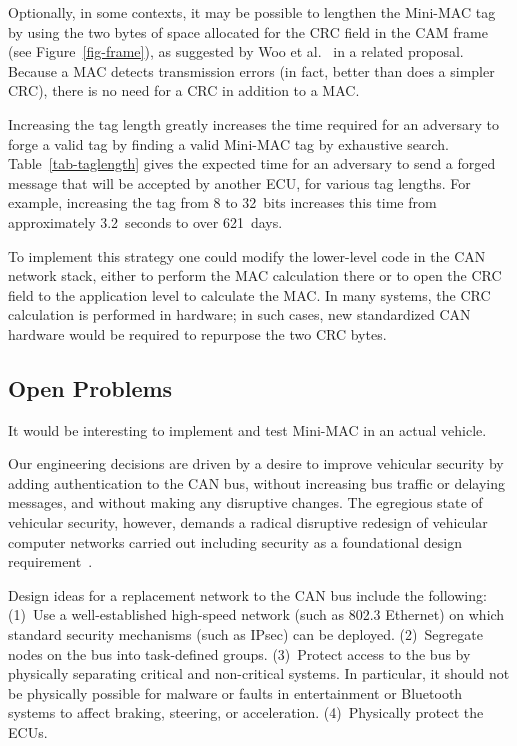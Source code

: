 Optionally, in some contexts, it may be 
possible to lengthen the Mini-MAC tag by 
using the two bytes of space allocated for the CRC field in the CAM frame (see Figure~\ref{fig-frame}),
as suggested by Woo et al.~\cite{Woo-14} in a related proposal.
Because a MAC detects transmission errors (in fact, better than does a simpler CRC), there is no need for
a CRC in addition to a MAC.  

Increasing the tag length greatly increases the time required for an adversary to forge a valid tag by
finding a valid Mini-MAC tag by exhaustive search.  
Table~\ref{tab-taglength} gives the expected time for an adversary to send a forged message 
that will be accepted by another ECU, for various tag lengths.  
For example, increasing the tag from 8 to 32~bits increases this time from
approximately 3.2~seconds to over 621~days.


To implement this strategy one could modify the lower-level code in the CAN network stack, 
either to perform the MAC calculation there 
or to open the CRC field to the application level to calculate the MAC. 
In many systems, the CRC calculation is performed in hardware;
in such cases, new standardized CAN hardware would be required to repurpose the two CRC bytes.

\subsection{Open Problems}
\label{open}

It would be interesting to implement and test Mini-MAC in an actual vehicle.

Our engineering decisions are driven by a desire to improve vehicular security by adding authentication
to the CAN bus, without increasing bus traffic or delaying messages, and without making any
disruptive changes.  The egregious state of vehicular security, however, demands a radical disruptive
redesign of vehicular computer networks carried out including security as a foundational design
requirement~\cite{Wolf2006}. 

Design ideas for a replacement network to the CAN bus include the following:  
(1)~Use a well-established high-speed network (such as 802.3 Ethernet) on which
standard security mechanisms (such as IPsec) can be deployed.
(2)~Segregate nodes on the bus into task-defined groups.
(3)~Protect access to the bus by physically separating critical and non-critical systems.
In particular, it should not be physically possible for malware or faults in entertainment or 
Bluetooth systems to affect braking, steering, or acceleration. 
(4)~Physically protect the ECUs. 

